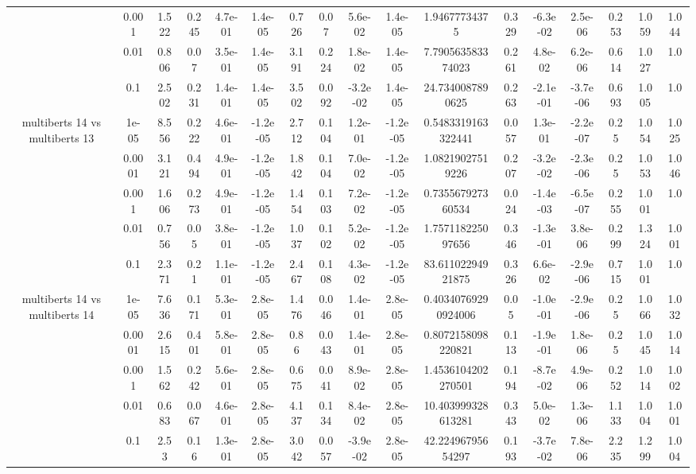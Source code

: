 \begin{tabular}{|c|c|c|c|c|c|c|c|c|c|c|c|c|c|c|c|c|}
 & 0.001 & 1.522 & 0.245 & 4.7e-01 & 1.4e-05 & 0.726 & 0.07 & 5.6e-02 & 1.4e-05 & 1.94677734375 & 0.329 & -6.3e-02 & 2.5e-06 & 0.253 & 1.059 & 1.044 \\
 & 0.01 & 0.806 & 0.07 & 3.5e-01 & 1.4e-05 & 3.191 & 0.224 & 1.8e-02 & 1.4e-05 & 7.790563583374023 & 0.261 & 4.8e-02 & 6.2e-06 & 0.614 & 1.027 & 1.0 \\
 & 0.1 & 2.502 & 0.231 & 1.4e-01 & 1.4e-05 & 3.502 & 0.092 & -3.2e-02 & 1.4e-05 & 24.7340087890625 & 0.263 & -2.1e-01 & -3.7e-06 & 0.693 & 1.005 & 1.0 \\
\hline
\multirow{5}{*}{multiberts 14 vs multiberts 13} & 1e-05 & 8.556 & 0.222 & 4.6e-01 & -1.2e-05 & 2.712 & 0.104 & 1.2e-01 & -1.2e-05 & 0.5483319163322441 & 0.057 & 1.3e-01 & -2.2e-07 & 0.25 & 1.054 & 1.025 \\
 & 0.0001 & 3.121 & 0.494 & 4.9e-01 & -1.2e-05 & 1.842 & 0.104 & 7.0e-02 & -1.2e-05 & 1.08219027519226 & 0.207 & -3.2e-02 & -2.3e-06 & 0.25 & 1.053 & 1.046 \\
 & 0.001 & 1.606 & 0.273 & 4.9e-01 & -1.2e-05 & 1.454 & 0.103 & 7.2e-02 & -1.2e-05 & 0.735567927360534 & 0.024 & -1.4e-03 & -6.5e-07 & 0.255 & 1.001 & 1.0 \\
 & 0.01 & 0.756 & 0.05 & 3.8e-01 & -1.2e-05 & 1.037 & 0.102 & 5.2e-02 & -1.2e-05 & 1.757118225097656 & 0.346 & -1.3e-01 & 3.8e-06 & 0.299 & 1.324 & 1.001 \\
 & 0.1 & 2.371 & 0.21 & 1.1e-01 & -1.2e-05 & 2.467 & 0.108 & 4.3e-02 & -1.2e-05 & 83.61102294921875 & 0.326 & 6.6e-02 & -2.9e-06 & 0.715 & 1.001 & 1.0 \\
\hline
\multirow{5}{*}{multiberts 14 vs multiberts 14} & 1e-05 & 7.636 & 0.171 & 5.3e-01 & 2.8e-05 & 1.476 & 0.046 & 1.4e-01 & 2.8e-05 & 0.40340769290924006 & 0.05 & -1.0e-01 & -2.9e-06 & 0.25 & 1.066 & 1.032 \\
 & 0.0001 & 2.615 & 0.401 & 5.8e-01 & 2.8e-05 & 0.86 & 0.043 & 1.4e-01 & 2.8e-05 & 0.8072158098220821 & 0.113 & -1.9e-01 & 1.8e-06 & 0.25 & 1.045 & 1.014 \\
 & 0.001 & 1.562 & 0.242 & 5.6e-01 & 2.8e-05 & 0.675 & 0.041 & 8.9e-02 & 2.8e-05 & 1.4536104202270501 & 0.194 & -8.7e-02 & 4.9e-06 & 0.252 & 1.014 & 1.002 \\
 & 0.01 & 0.683 & 0.067 & 4.6e-01 & 2.8e-05 & 4.137 & 0.134 & 8.4e-02 & 2.8e-05 & 10.403999328613281 & 0.343 & 5.0e-02 & 1.3e-06 & 1.133 & 1.004 & 1.001 \\
 & 0.1 & 2.53 & 0.16 & 1.3e-01 & 2.8e-05 & 3.042 & 0.057 & -3.9e-02 & 2.8e-05 & 42.22496795654297 & 0.193 & -3.7e-02 & 7.8e-06 & 2.235 & 1.299 & 1.004 \\

\end{tabular}
